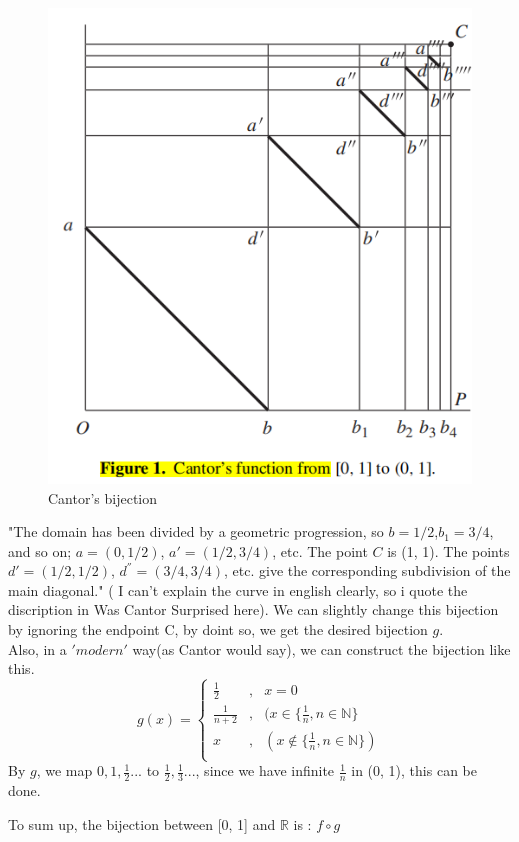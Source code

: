 \documentclass{article}
\begin{document}
    \begin{figure}[h]
        \centering
        \includegraphics[scale = 0.5]{cantor.png}
        \caption{Cantor's bijection}
    \end{figure}
    "The domain has been divided by a geometric progression, so $b = 1/2$,$ b_1 = 3/4$, and so on;
    $a = (0, 1/2)$, $a' = (1/2, 3/4)$, etc. The point $C$ is (1, 1). The points $d' = (1/2, 1/2)$, $d^{''} = (3/4, 3/4)$, etc. 
    give the corresponding subdivision of the main diagonal." ( I can't explain the curve in english clearly, so i quote the 
    discription in Was Cantor Surprised here). We can slightly change this bijection by ignoring the endpoint C, by doint so, we get 
    the desired bijection $g$.\\
    \hspace*{2em} Also, in a $'modern'$ way(as Cantor would say), we can construct the bijection like this.
    \begin{equation}
        g(x) = \left\{
        \begin{aligned}
            \frac{1}{2} &, & x = 0\\
            \frac{1}{n + 2} &, &(x \in \{\frac{1}{n}, n \in \mathbb{N}\}\\
            x &, &(x \notin \{\frac{1}{n}, n \in \mathbb{N}\})\\
        \end{aligned}
        \right.
    \end{equation}
    By $g$, we map $0, 1, \frac{1}{2}...$ to $\frac{1}{2}, \frac{1}{3}...$, since we have infinite $\frac{1}{n}$ in (0, 1), 
    this can be done.

    To sum up, the bijection between [0, 1] and $\mathbb{R}$ is : $f \circ g$
    
\end{document}
